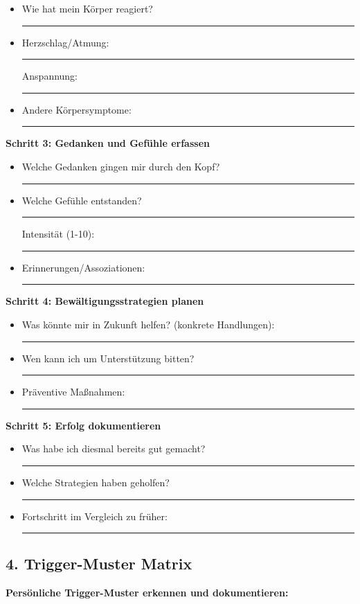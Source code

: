 {\begin{itemize}
\tightlist
\item
  Wie hat mein Körper reagiert? \rule{8cm}{0.4pt}
\item
  Herzschlag/Atmung: \rule{4cm}{0.4pt} Anspannung: \rule{4cm}{0.4pt}
\item
  Andere Körpersymptome: \rule{8cm}{0.4pt}
\end{itemize}

\textbf{Schritt 3: Gedanken und Gefühle erfassen}

\begin{itemize}
\tightlist
\item
  Welche Gedanken gingen mir durch den Kopf? \rule{8cm}{0.4pt}
\item
  Welche Gefühle entstanden? \rule{6cm}{0.4pt} Intensität (1-10): \rule{2cm}{0.4pt}
\item
  Erinnerungen/Assoziationen: \rule{8cm}{0.4pt}
\end{itemize}

\textbf{Schritt 4: Bewältigungsstrategien planen}

\begin{itemize}
\tightlist
\item
  Was könnte mir in Zukunft helfen? (konkrete Handlungen): \rule{8cm}{0.4pt}
\item
  Wen kann ich um Unterstützung bitten? \rule{8cm}{0.4pt}
\item
  Präventive Maßnahmen: \rule{8cm}{0.4pt}
\end{itemize}

\textbf{Schritt 5: Erfolg dokumentieren}

\begin{itemize}
\tightlist
\item
  Was habe ich diesmal bereits gut gemacht? \rule{8cm}{0.4pt}
\item
  Welche Strategien haben geholfen? \rule{8cm}{0.4pt}
\item
  Fortschritt im Vergleich zu früher: \rule{8cm}{0.4pt}
\end{itemize}

\hypertarget{trigger-muster-matrix}{%
\subsection{4. Trigger-Muster Matrix}}\label{trigger-muster-matrix}

\textbf{Persönliche Trigger-Muster erkennen und dokumentieren:}

}
